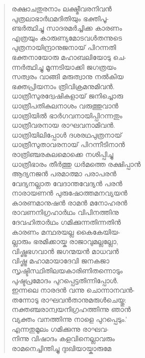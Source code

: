 \begin{verse}
രക്ഷാചതുരനാം ലക്ഷ്മീവരനിവന്‍\\
പുത്രലാഭാര്‍ഥമദിതിയും ഭക്തിപൂ-\\
ണ്ടര്‍ത്ഥിച്ചു സാദരമര്‍ച്ചിക്ക കാരണം\\
എത്രയും കാരുണ്യമോടവള്‍തന്നുടെ\\
പുത്രനായിന്ദ്രാനുജനായ് പിറന്നതി\\
ഭക്തനായോരു മഹാബലിയോടു ചെ-\\
ന്നര്‍ത്ഥിച്ചു മൂന്നടിയാക്കി ജഗത്രയം\\
സത്വരം വാങ്ങി മരുത്വാനു നല്‍കിയ\\
ഭക്തപ്രിയനാം ത്രിവിക്രമനുമിവന്‍.\\
ധാത്രീസുരദ്വേഷികളായ് ജനിച്ചൊരു\\
ധാത്രീപതികുലനാശം വരുത്തുവാന്‍\\
ധാത്രിയില്‍ ഭാര്‍ഗവനായിപ്പിറന്നതും\\
ധാത്രീവരനായ രാഘവനാമിവന്‍.\\
ധാത്രിയിലിപ്പോള്‍ ദശരഥപുത്രനായ്\\
ധാത്രീസുതാവരനായ് പിറന്നീടിനാന്‍\\
രാത്രിഞ്ചരകുലമൊക്കെ നശിപ്പിച്ചു\\
ധാത്രീഭാരം തീര്‍ത്തു ധര്‍മത്തെ രക്ഷിപ്പാന്‍\\
ആദ്യനജന്‍ പരമാത്മാ പരാപരന്‍\\
വേദ്യനല്ലാത വേദാന്തവേദ്യന്‍ പരന്‍\\
നാരായണന്‍ പുരുഷോത്തമനവ്യയന്‍\\
കാരണമാനുഷന്‍ രാമന്‍ മനോഹരന്‍\\
രാവണനിഗ്രഹാര്‍ഥം വിപിനത്തിനു\\
ദേവഹിതാര്‍ഥം ഗമിക്കുന്നതിന്നതിന്‍\\
കാരണം മന്ഥരയല്ല കൈകേയിയ-\\
ല്ലാരും ഭരമിക്കായ്ക രാജാവുമല്ലല്ലോ,\\
വിഷ്ണുഭഗവാന്‍ ജഗന്മയന്‍ മാധവന്‍\\
വിഷ്ണു മഹാമായാദേവി ജനകജാ\\
സൃഷ്ടിസ്ഥിതിലയകാരിണിതന്നൊടും\\
പുഷ്ടപ്രമോദം പുറപ്പെട്ടതിന്നിപ്പോള്‍.\\
ഇന്നലെ നാരദന്‍ വന്നു ചൊന്നാനവന്‍-\\
തന്നോടു രാഘവന്‍താനുമരുള്‍ചെയ്തു:\\
നക്തഞ്ചരാന്വയനിഗ്രഹത്തിന്നു ഞാന്‍\\
വ്യക്തം വനത്തിന്നു നാളെ പുറപ്പെടും.’\\
എന്നതുമൂലം ഗമിക്കുന്നു രാഘവ-\\
നിന്നു വിഷാദം കളവിനെല്ലാവരും\\
രാമനെച്ചിന്തിച്ചു ദുഃഖിയായ്കാരുമേ\\

\end{verse}
